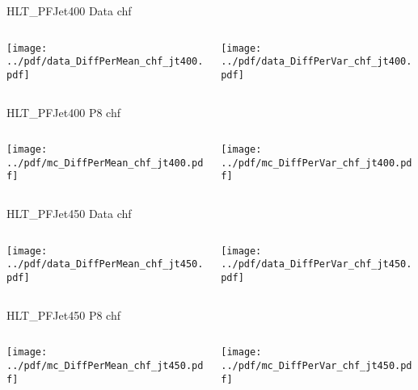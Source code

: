 \documentclass[9pt]{beamer}
\begin{document}
\begin{frame}[t]{HLT\_PFJet400 Data chf}
\begin{columns}[T]
  \begin{column}{.5\textwidth}
  \texttt{[image: ../pdf/data\_DiffPerMean\_chf\_jt400.pdf]}
  \end{column}
  \begin{column}{.5\textwidth}
  \texttt{[image: ../pdf/data\_DiffPerVar\_chf\_jt400.pdf]}
  \end{column}
\end{columns}
\end{frame}

\begin{frame}[t]{HLT\_PFJet400 P8 chf}
\begin{columns}[T]
  \begin{column}{.5\textwidth}
  \texttt{[image: ../pdf/mc\_DiffPerMean\_chf\_jt400.pdf]}
  \end{column}
  \begin{column}{.5\textwidth}
  \texttt{[image: ../pdf/mc\_DiffPerVar\_chf\_jt400.pdf]}
  \end{column}
\end{columns}
\end{frame}

\begin{frame}[t]{HLT\_PFJet450 Data chf}
\begin{columns}[T]
  \begin{column}{.5\textwidth}
  \texttt{[image: ../pdf/data\_DiffPerMean\_chf\_jt450.pdf]}
  \end{column}
  \begin{column}{.5\textwidth}
  \texttt{[image: ../pdf/data\_DiffPerVar\_chf\_jt450.pdf]}
  \end{column}
\end{columns}
\end{frame}

\begin{frame}[t]{HLT\_PFJet450 P8 chf}
\begin{columns}[T]
  \begin{column}{.5\textwidth}
  \texttt{[image: ../pdf/mc\_DiffPerMean\_chf\_jt450.pdf]}
  \end{column}
  \begin{column}{.5\textwidth}
  \texttt{[image: ../pdf/mc\_DiffPerVar\_chf\_jt450.pdf]}
  \end{column}
\end{columns}
\end{frame}
\end{document}
